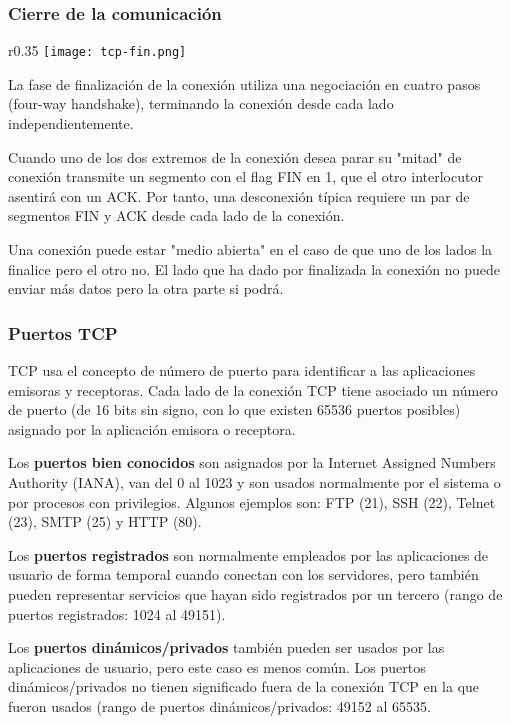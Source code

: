 \subsubsection{Cierre de la comunicación}
\begin{wrapfigure}{r}{0.35\linewidth}
    \hfill
    \texttt{[image: tcp-fin.png]}
    \vspace{-10pt}
\end{wrapfigure}
La fase de finalización de la conexión utiliza una negociación en cuatro pasos (four-way handshake), terminando la conexión desde cada lado independientemente.

Cuando uno de los dos extremos de la conexión desea parar su "mitad" de conexión transmite un segmento con el flag FIN en 1, que el otro interlocutor asentirá con un ACK. Por tanto, una desconexión típica requiere un par de segmentos FIN y ACK desde cada lado de la conexión.

Una conexión puede estar "medio abierta" en el caso de que uno de los lados la finalice pero el otro no. El lado que ha dado por finalizada la conexión no puede enviar más datos pero la otra parte si podrá.



\subsubsection{Puertos TCP}
TCP usa el concepto de número de puerto para identificar a las aplicaciones emisoras y receptoras. Cada lado de la conexión TCP tiene asociado un número de puerto (de 16 bits sin signo, con lo que existen 65536 puertos posibles) asignado por la aplicación emisora o receptora.

Los \textbf{puertos bien conocidos} son asignados por la Internet Assigned Numbers Authority (IANA), van del 0 al 1023 y son usados normalmente por el sistema o por procesos con privilegios. Algunos ejemplos son: FTP (21), SSH (22), Telnet (23), SMTP (25) y HTTP (80).

Los \textbf{puertos registrados} son normalmente empleados por las aplicaciones de usuario de forma temporal cuando conectan con los servidores, pero también pueden representar servicios que hayan sido registrados por un tercero (rango de puertos registrados: 1024 al 49151).

Los \textbf{puertos dinámicos/privados} también pueden ser usados por las aplicaciones de usuario, pero este caso es menos común. Los puertos dinámicos/privados no tienen significado fuera de la conexión TCP en la que fueron usados (rango de puertos dinámicos/privados: 49152 al 65535.